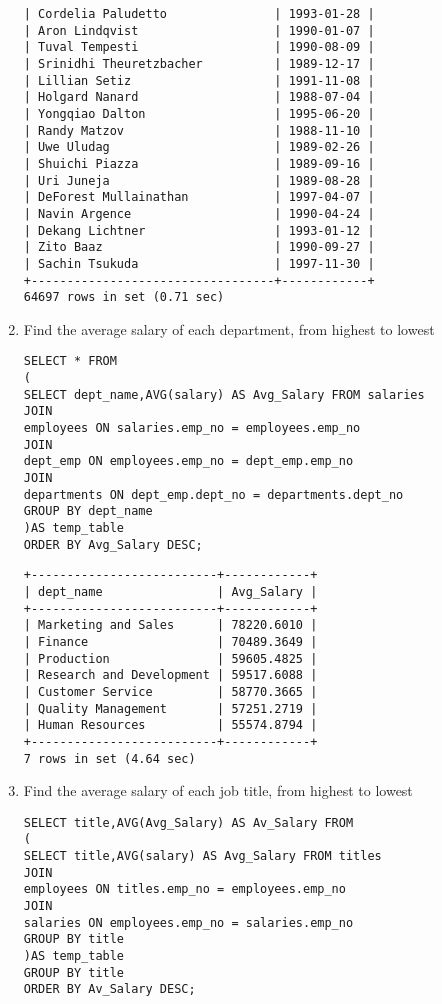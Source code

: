 \documentclass[]{article}
\begin{document}
\begin{enumerate}
\begin{verbatim}
| Cordelia Paludetto               | 1993-01-28 |
| Aron Lindqvist                   | 1990-01-07 |
| Tuval Tempesti                   | 1990-08-09 |
| Srinidhi Theuretzbacher          | 1989-12-17 |
| Lillian Setiz                    | 1991-11-08 |
| Holgard Nanard                   | 1988-07-04 |
| Yongqiao Dalton                  | 1995-06-20 |
| Randy Matzov                     | 1988-11-10 |
| Uwe Uludag                       | 1989-02-26 |
| Shuichi Piazza                   | 1989-09-16 |
| Uri Juneja                       | 1989-08-28 |
| DeForest Mullainathan            | 1997-04-07 |
| Navin Argence                    | 1990-04-24 |
| Dekang Lichtner                  | 1993-01-12 |
| Zito Baaz                        | 1990-09-27 |
| Sachin Tsukuda                   | 1997-11-30 |
+----------------------------------+------------+
64697 rows in set (0.71 sec)
\end{verbatim}

\item Find the average salary of each department, from highest to lowest

\begin{verbatim}
SELECT * FROM
(
SELECT dept_name,AVG(salary) AS Avg_Salary FROM salaries
JOIN 
employees ON salaries.emp_no = employees.emp_no
JOIN
dept_emp ON employees.emp_no = dept_emp.emp_no
JOIN
departments ON dept_emp.dept_no = departments.dept_no
GROUP BY dept_name
)AS temp_table
ORDER BY Avg_Salary DESC;
\end{verbatim}

\begin{verbatim}
+--------------------------+------------+
| dept_name                | Avg_Salary |
+--------------------------+------------+
| Marketing and Sales      | 78220.6010 |
| Finance                  | 70489.3649 |
| Production               | 59605.4825 |
| Research and Development | 59517.6088 |
| Customer Service         | 58770.3665 |
| Quality Management       | 57251.2719 |
| Human Resources          | 55574.8794 |
+--------------------------+------------+
7 rows in set (4.64 sec)
\end{verbatim}

\item Find the average salary of each job title, from highest to lowest

\begin{verbatim}
SELECT title,AVG(Avg_Salary) AS Av_Salary FROM
(
SELECT title,AVG(salary) AS Avg_Salary FROM titles
JOIN 
employees ON titles.emp_no = employees.emp_no
JOIN
salaries ON employees.emp_no = salaries.emp_no
GROUP BY title
)AS temp_table
GROUP BY title
ORDER BY Av_Salary DESC;
\end{verbatim}


\end{enumerate}
\end{document}

